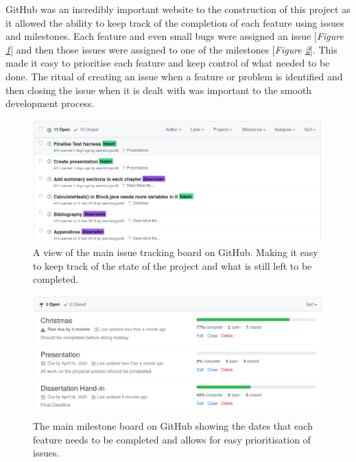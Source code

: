 \documentclass{l4proj}
\begin{document}
GitHub was an incredibly important website to the construction of this project as it allowed the ability to keep
track of the completion of each feature using issues and milestones. Each feature and even small bugs were assigned
an issue [\textit{Figure \ref{fig:issues}}] and then those issues were assigned to one of the milestones [\textit{Figure \ref{fig:milestones}}]. 
This made it easy to prioritise each feature and keep control of what needed to be done. The ritual of creating
an issue when a feature or problem is identified and then closing the issue when it is dealt with was important to 
the smooth development process.


\begin{figure}[!ht]
    \centering
    \includegraphics[width=1\linewidth]{images/issues.png}    

    \caption{
        A view of the main issue tracking board on GitHub. Making it easy to keep track of the state of the project
        and what is still left to be completed.
    }
    \label{fig:issues} 
\end{figure}
\vspace{10cm}

\begin{figure}[!ht]
    \centering
    \includegraphics[width=1\linewidth]{images/milestones.png}    

    \caption{
        The main milestone board on GitHub showing the dates that each feature needs to be completed and
        allows for easy prioritisation of issues.
    }
    \label{fig:milestones} 
\end{figure}
\end{document}
